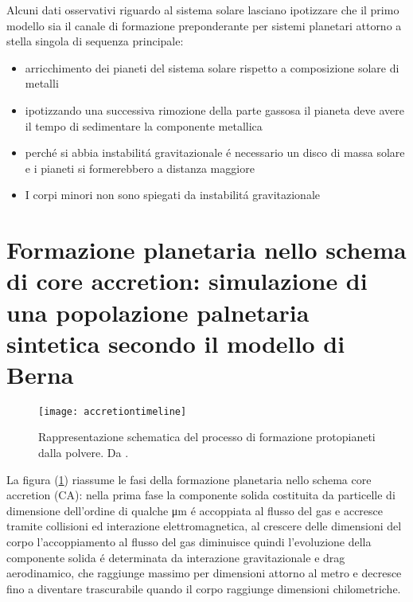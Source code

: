 \documentclass[twoside,11pt,fleqn]{memoir}%
\begin{document}
\begin{workout}
	Alcuni dati osservativi riguardo al sistema solare lasciano ipotizzare che il primo modello sia il canale di formazione preponderante per sistemi planetari attorno a stella singola di sequenza principale:
	\begin{itemize}
		\item arricchimento dei pianeti del sistema solare rispetto a composizione solare di metalli%
		\item ipotizzando una successiva rimozione della parte gassosa il pianeta deve avere il tempo di sedimentare la componente metallica
		\item perch\'e si abbia instabilit\'a gravitazionale \'e necessario un disco di massa solare e i pianeti si formerebbero a distanza maggiore
		\item I corpi minori non sono spiegati da instabilit\'a gravitazionale
	\end{itemize}
\end{workout}


\cleartorecto

{\let\clearpage\relax\let\cleardoublepage\relax
\part{Formazione planetaria nello schema di core accretion: simulazione di una popolazione palnetaria sintetica secondo il modello di Berna }\label{part:CApps}
}
\begin{figure}[!ht]
\texttt{[image: accretiontimeline]}\caption{Rappresentazione schematica del processo di formazione protopianeti dalla polvere. Da \cite{perryman2011exoplanet}.}\label{fig:accretiontimeline}
\end{figure}

La figura (\ref{fig:accretiontimeline}) riassume le fasi della formazione planetaria nello schema core accretion (CA): nella prima fase la componente solida costituita da particelle di dimensione dell'ordine di qualche \si{\micro\meter} \'e accoppiata al flusso del gas e accresce tramite collisioni ed interazione elettromagnetica, al crescere delle dimensioni del corpo l'accoppiamento al flusso del gas diminuisce quindi l'evoluzione della componente solida \'e determinata da interazione gravitazionale e drag aerodinamico, che raggiunge massimo per dimensioni attorno al metro e decresce fino a diventare trascurabile quando il corpo raggiunge dimensioni chilometriche.
\end{document}
